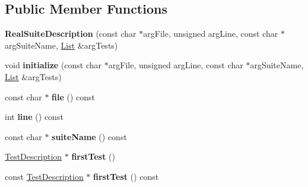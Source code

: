 \subsection*{Public Member Functions}
\begin{DoxyCompactItemize}
\item 
\hypertarget{classCxxTest_1_1RealSuiteDescription_a61109fded427ee8026a361e9f68cef52}{{\bfseries Real\-Suite\-Description} (const char $\ast$arg\-File, unsigned arg\-Line, const char $\ast$arg\-Suite\-Name, \hyperlink{structCxxTest_1_1List}{List} \&arg\-Tests)}\label{classCxxTest_1_1RealSuiteDescription_a61109fded427ee8026a361e9f68cef52}

\item 
\hypertarget{classCxxTest_1_1RealSuiteDescription_a811890086af46b3ffb944d80d5aca732}{void {\bfseries initialize} (const char $\ast$arg\-File, unsigned arg\-Line, const char $\ast$arg\-Suite\-Name, \hyperlink{structCxxTest_1_1List}{List} \&arg\-Tests)}\label{classCxxTest_1_1RealSuiteDescription_a811890086af46b3ffb944d80d5aca732}

\item 
\hypertarget{classCxxTest_1_1RealSuiteDescription_acd3a9e164527856223b0760f77b3c415}{const char $\ast$ {\bfseries file} () const }\label{classCxxTest_1_1RealSuiteDescription_acd3a9e164527856223b0760f77b3c415}

\item 
\hypertarget{classCxxTest_1_1RealSuiteDescription_a582c465bbec66898d3e659dd426bcb4f}{int {\bfseries line} () const }\label{classCxxTest_1_1RealSuiteDescription_a582c465bbec66898d3e659dd426bcb4f}

\item 
\hypertarget{classCxxTest_1_1RealSuiteDescription_a636ea7442f81dffd77d5e6c0b8e0905e}{const char $\ast$ {\bfseries suite\-Name} () const }\label{classCxxTest_1_1RealSuiteDescription_a636ea7442f81dffd77d5e6c0b8e0905e}

\item 
\hypertarget{classCxxTest_1_1RealSuiteDescription_a5abbe76febc9d17b111518209f11f82e}{\hyperlink{classCxxTest_1_1TestDescription}{Test\-Description} $\ast$ {\bfseries first\-Test} ()}\label{classCxxTest_1_1RealSuiteDescription_a5abbe76febc9d17b111518209f11f82e}

\item 
\hypertarget{classCxxTest_1_1RealSuiteDescription_aed41029593801910a107b29767373c17}{const \hyperlink{classCxxTest_1_1TestDescription}{Test\-Description} $\ast$ {\bfseries first\-Test} () const }\label{classCxxTest_1_1RealSuiteDescription_aed41029593801910a107b29767373c17}


\end{DoxyCompactItemize}
